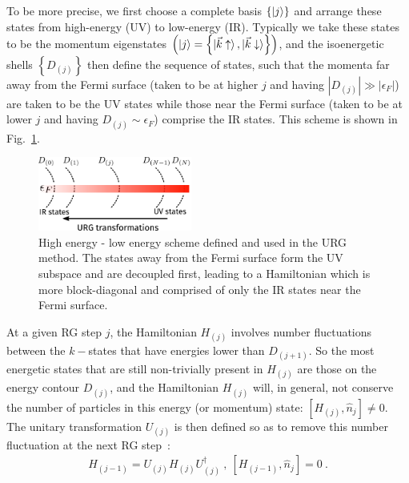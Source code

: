 \documentclass[reprint,superscriptaddress,floatfix]{revtex4-2}
\begin{document}
To be more precise, we first choose a complete basis \(\left\{ \ket{j} \right\} \) and arrange these states from high-energy (UV) to low-energy (IR). Typically we take these states to be the momentum eigenstates \(\left(\ket{j} = \left\{\ket{\vec k \uparrow}, \ket{\vec k \downarrow}\right\}\right)\), and the isoenergetic shells \(\left\{D_{(j)}\right\}\) then define the sequence of states, such that the momenta far away from the Fermi surface (taken to be at higher \(j\) and having \(|D_{(j)}| \gg |\epsilon_F|\)) are taken to be the UV states while those near the Fermi surface (taken to be at lower \(j\) and having \(D_{(j)} \sim \epsilon_F\)) comprise the IR states. This scheme is shown in Fig.~\ref{urg-scheme}.

\begin{figure}[!htb]
	\centering
	\includegraphics[width=0.45\textwidth]{urg-scheme.pdf}
	\caption{High energy - low energy scheme defined and used in the URG method. The states away from the Fermi surface form the UV subspace and are decoupled first, leading to a Hamiltonian which is more block-diagonal and comprised of only the IR states near the Fermi surface.}
	\label{urg-scheme}
\end{figure}

At a given RG step \(j\), the Hamiltonian \(H_{(j)}\) involves number fluctuations between the \(k-\)states that have energies lower than \(D_{(j+1)}\). So the most energetic states that are still non-trivially present in \(H_{(j)}\) are those on the energy contour \(D_{(j)}\), and the Hamiltonian \(H_{(j)}\) will, in general, not conserve the number of particles in this energy (or momentum) state: \(\left[H_{(j)}, \hat n_{j}\right] \neq 0\). The unitary transformation \(U_{(j)}\) is then defined so as to remove this number fluctuation at the next RG step~\cite{anirbanurg1,anirbanurg2}:
\begin{equation}\begin{aligned}
	H_{(j-1)} = U_{(j)} H_{(j)} U^\dagger_{(j)}~, ~\left[H_{(j-1)}, \hat n_{j}\right] =0~.
\end{aligned}\end{equation}
\end{document}
